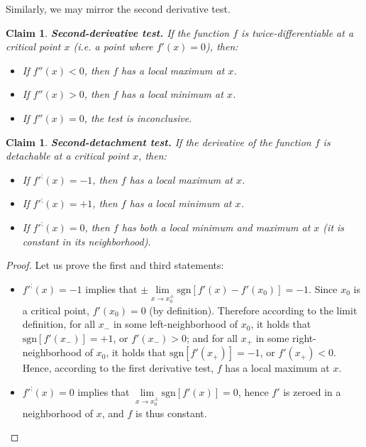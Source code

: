 \documentclass[11pt]{book}
\newtheorem{clm}[thm]{Claim}
\begin{document}
Similarly, we may mirror the second derivative test.
\begin{clm}\textbf{Second-derivative test. }If the function $f$ is twice-differentiable
at a critical point $x$ (i.e. a point where $f'\left(x\right)=0$),
then:
\begin{itemize}
\item If $f''\left(x\right)<0$, then $f$ has a local maximum at $x$.
\item If $f''\left(x\right)>0$, then $f$ has a local minimum at $x$.
\item If $f''\left(x\right)=0$, the test is inconclusive.
\end{itemize}
\label{second_derivative_test}
\end{clm}
\begin{clm}\textbf{Second-detachment test. }If the derivative of the function $f$
is detachable at a critical point $x$, then:
\begin{itemize}
\item If $f'^{;}\left(x\right)=-1$, then $f$ has a local maximum at $x$.
\item If $f'^{;}\left(x\right)=+1$, then $f$ has a local minimum at $x$.
\item If $f'^{;}\left(x\right)=0$, then $f$ has both a local minimum and
maximum at $x$ (it is constant in its neighborhood).
\end{itemize}
\label{second_detachment_test}
\end{clm}
\begin{proof}Let us prove the first and third statements:
\begin{itemize}
\item $f'^{;}\left(x\right)=-1$ implies that $\pm\underset{x\to x_{0}^{\pm}}{\lim}\text{sgn}\left[f'\left(x\right)-f'\left(x_{0}\right)\right]=-1$.
Since $x_{0}$ is a critical point, $f'\left(x_{0}\right)=0$ (by
definition). Therefore according to the limit definition, for all
$x_{-}$ in some left-neighborhood of $x_{0}$, it holds that $\text{sgn}\left[f'\left(x_{-}\right)\right]=+1$,
or $f'\left(x_{-}\right)>0$; and for all $x_{+}$ in some right-neighborhood
of $x_{0}$, it holds that $\text{sgn}\left[f'\left(x_{+}\right)\right]=-1$,
or $f'\left(x_{+}\right)<0$. Hence, according to the first derivative
test, $f$ has a local maximum at $x$.
\item $f'^{;}\left(x\right)=0$ implies that $\underset{x\to x_{0}^{\pm}}{\lim}\text{sgn}\left[f'\left(x\right)\right]=0$,
hence $f'$ is zeroed in a neighborhood of $x$, and $f$ is thus
constant.
\end{itemize}
\end{proof}
\end{document}
